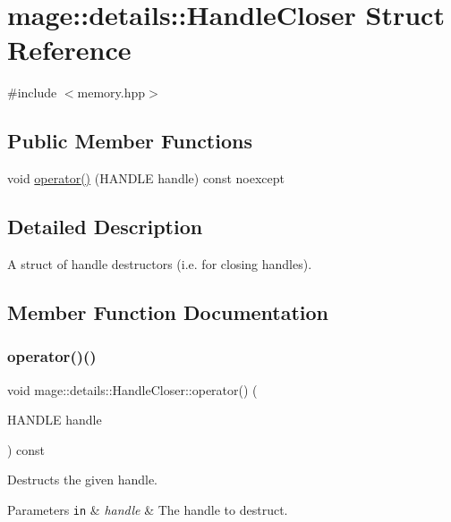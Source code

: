 \hypertarget{structmage_1_1details_1_1_handle_closer}{}\section{mage\+:\+:details\+:\+:Handle\+Closer Struct Reference}
\label{structmage_1_1details_1_1_handle_closer}


{\ttfamily \#include $<$memory.\+hpp$>$}

\subsection*{Public Member Functions}
\begin{DoxyCompactItemize}
\item 
void \mbox{\hyperlink{structmage_1_1details_1_1_handle_closer_a99a0f29f40d3e2032946e8adbec98266}{operator()}} (H\+A\+N\+D\+LE handle) const noexcept
\end{DoxyCompactItemize}


\subsection{Detailed Description}
A struct of handle destructors (i.\+e. for closing handles). 

\subsection{Member Function Documentation}
\mbox{\label{structmage_1_1details_1_1_handle_closer_a99a0f29f40d3e2032946e8adbec98266}} 
\subsubsection{\texorpdfstring{operator()()}{operator()()}}
{\footnotesize\ttfamily void mage\+::details\+::\+Handle\+Closer\+::operator() (\begin{DoxyParamCaption}\item[{H\+A\+N\+D\+LE}]{handle }\end{DoxyParamCaption}) const\hspace{0.3cm}{\ttfamily [noexcept]}}

Destructs the given handle.


\begin{DoxyParams}[1]{Parameters}
\mbox{\tt in}  & {\em handle} & The handle to destruct. \\
\hline
\end{DoxyParams}
